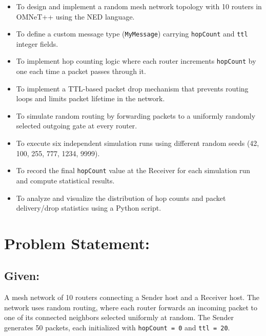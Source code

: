 \documentclass[12pt,a4paper]{article}
\begin{document}
\begin{itemize}
  \item To design and implement a random mesh network topology with 10 routers in OMNeT++ using the NED language.
  \item To define a custom message type (\texttt{MyMessage}) carrying \texttt{hopCount} and \texttt{ttl} integer fields.
  \item To implement hop counting logic where each router increments \texttt{hopCount} by one each time a packet passes through it.
  \item To implement a TTL-based packet drop mechanism that prevents routing loops and limits packet lifetime in the network.
  \item To simulate random routing by forwarding packets to a uniformly randomly selected outgoing gate at every router.
  \item To execute six independent simulation runs using different random seeds (42, 100, 255, 777, 1234, 9999).
  \item To record the final \texttt{hopCount} value at the Receiver for each simulation run and compute statistical results.
  \item To analyze and visualize the distribution of hop counts and packet delivery/drop statistics using a Python script.
\end{itemize}

\section{Problem Statement: }

\subsection*{Given:}
\justifying
A mesh network of 10 routers connecting a Sender host and a Receiver host. The network uses random routing, where each router forwards an incoming packet to one of its connected neighbors selected uniformly at random. The Sender generates 50 packets, each initialized with \texttt{hopCount = 0} and \texttt{ttl = 20}.
\end{document}
